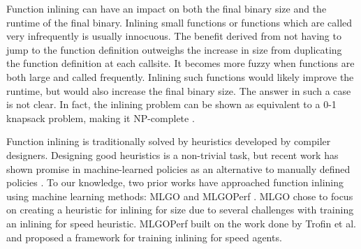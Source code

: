 \documentclass[nohyperref]{article}
\theoremstyle{plain}
\theoremstyle{definition}
\theoremstyle{remark}
\begin{document}
Function inlining can have an impact on both the final binary size and the runtime of the final binary. Inlining small functions or functions which are called very infrequently is usually innocuous. The benefit derived from not having to jump to the function definition outweighs the increase in size from duplicating the function definition at each callsite. It becomes more fuzzy when functions are both large and called frequently. Inlining such functions would likely improve the runtime, but would also increase the final binary size. The answer in such a case is not clear. In fact, the inlining problem can be shown as equivalent to a 0-1 knapsack problem, making it NP-complete \cite{Theodoridis_Grosser_Su_2022}. 

Function inlining is traditionally solved by heuristics developed by compiler designers. Designing good heuristics is a non-trivial task, but recent work has shown promise in machine-learned policies as an alternative to manually defined policies \cite{mlgo}. To our knowledge, two prior works have approached function inlining using machine learning methods: MLGO \cite{mlgo} and MLGOPerf \cite{mlgoperf}. MLGO chose to focus on creating a heuristic for inlining for size due to several challenges with training an inlining for speed heuristic. MLGOPerf built on the work done by Trofin et al. and proposed a framework for training inlining for speed agents.
\end{document}
